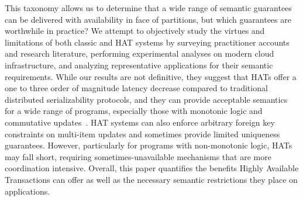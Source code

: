 This taxonomy allows us to determine that a wide range of semantic
guarantees can be delivered with availability in face of partitions,
but which guarantees are worthwhile in practice? We attempt to
objectively study the virtues and limitations of both classic and HAT
systems by surveying practitioner accounts and research literature,
performing experimental analyses on modern cloud infrastructure, and
analyzing representative applications for their semantic
requirements. While our results are not definitive, they suggest that
HATs offer a one to three order of magnitude latency decrease compared
to traditional distributed serializability protocols, and they can
provide acceptable semantics for a wide range of programs, especially
those with monotonic logic and commutative updates~\cite{calm, blooml,
  crdt}. HAT systems can also enforce arbitrary foreign key
constraints on multi-item updates and sometimes provide limited
uniqueness guarantees. However, particularly for programs with
non-monotonic logic, HATs may fall short, requiring
sometimes-unavailable mechanisms that are more
coordination intensive. Overall, this paper quantifies the benefits
Highly Available Transactions can offer as well as the necessary
semantic restrictions they place on applications.




